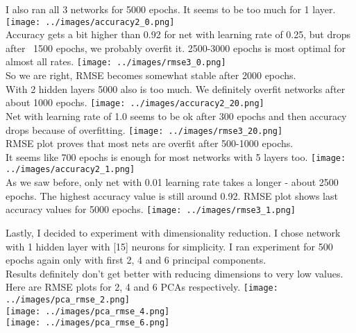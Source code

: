 \documentclass[12pt, letterpaper]{article}
\begin{document}
\begin{enumerate}[label=\Roman*.]
	   I also ran all 3 networks for 5000 epochs. It seems to be too much for 1 layer.
	   {\center \texttt{[image: ../images/accuracy2\_0.png]} \\}
	   Accuracy gets a bit higher than 0.92 for net with learning rate of 0.25, but drops after ~1500 epochs, we probably overfit it. 2500-3000 epochs is most optimal for almost all rates.
	    {\center \texttt{[image: ../images/rmse3\_0.png]} \\}
	    So we are right, RMSE becomes somewhat stable after 2000 epochs.\\
	    
	    With 2 hidden layers 5000 also is too much. We definitely overfit networks after about 1000 epochs.
	     {\center \texttt{[image: ../images/accuracy2\_20.png]} \\}
	     Net with learning rate of 1.0 seems to be ok after 300 epochs and then accuracy drops because of overfitting.
	     {\center \texttt{[image: ../images/rmse3\_20.png]} \\}
	     RMSE plot proves that most nets are overfit after 500-1000 epochs.\\
	     
	    It seems like 700 epochs is enough for most networks with 5 layers too.
	    {\center \texttt{[image: ../images/accuracy2\_1.png]} \\}
	    As we saw before, only net with 0.01 learning rate takes a longer - about 2500 epochs. The highest accuracy value is still around 0.92.
	    RMSE plot shows last accuracy values for 5000 epochs.
	    {\center \texttt{[image: ../images/rmse3\_1.png]} \\}
	    
	    Lastly, I decided to experiment with dimensionality reduction. I chose network with 1 hidden layer with [15] neurons for simplicity. I ran experiment for 500 epochs again only with first 2, 4 and 6 principal components. \\
	    
	    Results definitely don't get better with reducing dimensions to very low values. Here are RMSE plots for 2, 4 and 6 PCAs respectively.
	    {\center \texttt{[image: ../images/pca\_rmse\_2.png]} \\}
	    {\center \texttt{[image: ../images/pca\_rmse\_4.png]} \\}
	    {\center \texttt{[image: ../images/pca\_rmse\_6.png]} \\}
	    

\end{enumerate}
\end{document}
